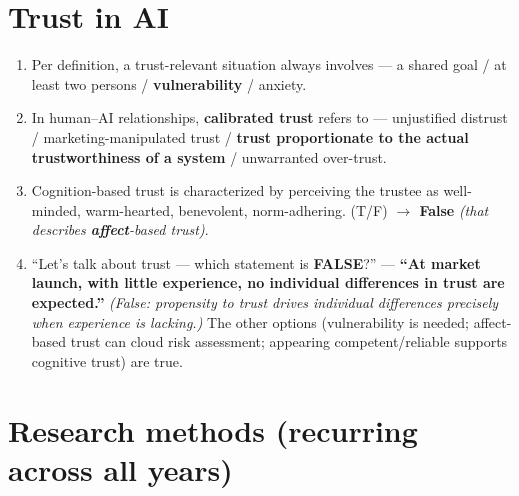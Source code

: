 \documentclass[11pt, oneside]{book}
\begin{document}
\section{Trust in AI}

\begin{enumerate}[leftmargin=1.6em, itemsep=4pt]
\item Per definition, a trust-relevant situation always involves — a shared
goal / at least two persons / \textbf{vulnerability} / anxiety.
\item In human--AI relationships, \textbf{calibrated trust} refers to —
unjustified distrust / marketing-manipulated trust / \textbf{trust proportionate
to the actual trustworthiness of a system} / unwarranted over-trust.
\item Cognition-based trust is characterized by perceiving the trustee as
well-minded, warm-hearted, benevolent, norm-adhering. (T/F) \hfill\textbf{$\to$
False} \emph{(that describes \textbf{affect}-based trust)}.
\item ``Let's talk about trust — which statement is \textbf{FALSE}?'' —
\textbf{``At market launch, with little experience, no individual differences in
trust are expected.''} \emph{(False: propensity to trust drives individual
differences \emph{precisely} when experience is lacking.)} The other options
(vulnerability is needed; affect-based trust can cloud risk assessment;
appearing competent/reliable supports cognitive trust) are true.
\end{enumerate}

\section{Research methods (recurring across all years)}
\end{document}
